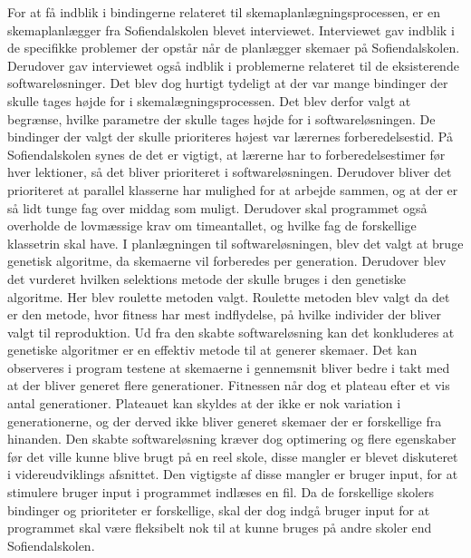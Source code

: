 For at få indblik i bindingerne relateret til skemaplanlægningsprocessen, er en skemaplanlægger fra Sofiendalskolen blevet interviewet. Interviewet gav indblik i de specifikke problemer der opstår når de planlægger skemaer på Sofiendalskolen. Derudover gav interviewet også indblik i problemerne relateret til de eksisterende softwareløsninger. Det blev dog hurtigt tydeligt at der var mange bindinger der skulle tages højde for i skemalægningsprocessen. Det blev derfor valgt at begrænse, hvilke parametre der skulle tages højde for i softwareløsningen. 
De bindinger der valgt der skulle prioriteres højest var lærernes forberedelsestid. På Sofiendalskolen synes de det er vigtigt, at lærerne har to forberedelsestimer før hver lektioner, så det bliver prioriteret i softwareløsningen. Derudover bliver det prioriteret at parallel klasserne har mulighed for at arbejde sammen, og at der er så lidt tunge fag over middag som muligt. Derudover skal programmet også overholde de lovmæssige krav om timeantallet, og hvilke fag de forskellige klassetrin skal have. 
I planlægningen til softwareløsningen, blev det valgt at bruge genetisk algoritme, da skemaerne vil forberedes per generation. Derudover blev det vurderet hvilken selektions metode der skulle bruges i den genetiske algoritme. Her blev roulette metoden valgt. Roulette metoden blev valgt da det er den metode, hvor fitness har mest indflydelse, på hvilke individer der bliver valgt til reproduktion. 
Ud fra den skabte softwareløsning kan det konkluderes at genetiske algoritmer er en effektiv metode til at generer skemaer. Det kan observeres i program testene at skemaerne i gennemsnit bliver bedre i takt med at der bliver generet flere generationer. Fitnessen når dog et plateau efter et vis antal generationer. Plateauet kan skyldes at der ikke er nok variation i generationerne, og der derved ikke bliver generet skemaer der er forskellige fra hinanden. Den skabte softwareløsning kræver dog optimering og flere egenskaber før det ville kunne blive brugt på en reel skole, disse mangler er blevet diskuteret i videreudviklings afsnittet. Den vigtigste af disse mangler er bruger input, for at stimulere bruger input i programmet indlæses en fil. Da de forskellige skolers bindinger og prioriteter er forskellige, skal der dog indgå bruger input for at programmet skal være fleksibelt nok til at kunne bruges på andre skoler end Sofiendalskolen.
